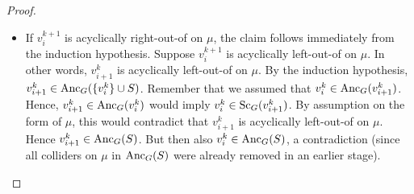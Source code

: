 \begin{proof}
\begin{itemize}
      Hence $v^{k+1}_{i-1} \in \Anc_G(\{v^{k+1}_{i}\} \cup S)$.
      If $v^{k+1}_{i-1}$ is acyclically left-out-of on $\mu$, the claim follows immediately from the induction hypothesis.
    \item If $v^{k+1}_{i}$ is acyclically right-out-of on $\mu$, the claim follows immediately from the induction hypothesis.
      Suppose $v^{k+1}_{i}$ is acyclically left-out-of on $\mu$.
      In other words, $v^k_{i+1}$ is acyclically left-out-of on $\mu$.
      By the induction hypothesis, $v^{k}_{i+1} \in \mathrm{Anc}_G(\{v^k_{i}\} \cup S)$.
      Remember that we assumed that $v^k_{i} \in \mathrm{Anc}_G(v^k_{i+1})$. 
      Hence, $v^{k}_{i+1} \in \mathrm{Anc}_G(v^k_i)$ would imply $v^k_i \in \mathrm{Sc}_G(v^k_{i+1})$.
      By assumption on the form of $\mu$, this would contradict that $v^k_{i+1}$ is acyclically left-out-of on $\mu$.
      Hence $v^{k}_{i+1} \in \mathrm{Anc}_G(S)$.
      But then also $v^k_i \in \mathrm{Anc}_G(S)$, a contradiction (since all colliders on $\mu$ in $\mathrm{Anc}_G(S)$ were already removed in an earlier stage). %

\end{itemize}
\end{proof}
